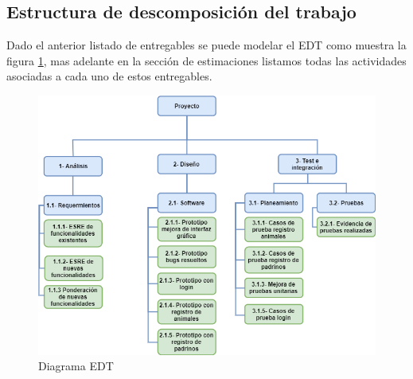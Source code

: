 \subsection{Estructura de descomposición del trabajo}

Dado el anterior listado de entregables se puede modelar el EDT como muestra la figura \ref{fig:edt}, mas adelante en la sección de estimaciones listamos todas las actividades asociadas a cada uno de estos entregables.

\begin{figure}[H]
    \centering
    \includegraphics[scale=0.6]{Files/edtv4.png}
    \caption{Diagrama EDT}
    \label{fig:edt}
\end{figure}

